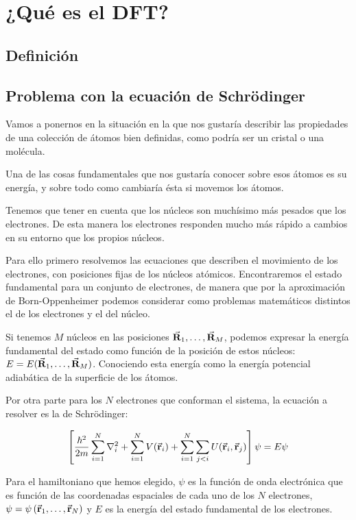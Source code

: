 \section{¿Qué es el DFT?}

\subsection{Definición}

\subsection{Problema con la ecuación de Schrödinger} 

Vamos a ponernos en la situación en la que nos gustaría describir las propiedades de una colección de átomos bien definidas, como podría ser un cristal o una molécula.

Una de las cosas fundamentales que nos gustaría conocer sobre esos átomos es su energía, y sobre todo como cambiaría ésta si movemos los átomos.

Tenemos que tener en cuenta que los núcleos son muchísimo más pesados que los electrones. De esta manera los electrones responden mucho más rápido a cambios en su entorno que los propios núcleos.

Para ello primero resolvemos las ecuaciones que describen el movimiento de los electrones, con posiciones fijas de los núcleos atómicos. Encontraremos el estado fundamental para un conjunto de electrones, de manera que por la aproximación de Born-Oppenheimer podemos considerar como problemas matemáticos distintos el de los electrones y el del núcleo.

Si tenemos $M$ núcleos en las posiciones $\va{R}_1 , \dots , \va{R}_M$, podemos expresar la energía fundamental del estado como función de la posición de estos núcleos: $E = E(\va{R}_1 , \dots , \va{R}_M)$. Conociendo esta energía como la energía potencial adiabática de la superficie de los átomos.

Por otra parte para los $N$ electrones que conforman el sistema, la ecuación a resolver es la de Schrödinger: 

\begin{equation}
    \left[ \frac{\hbar^2}{2m} \sum_{i=1}^{N} \laplacian_i + \sum_{i=1}^{N} V(\va{r}_i) + \sum_{i=1}^{N} \sum_{j<i} U(\va{r}_i , \va{r}_j) \right] \psi = E \psi
\end{equation}


Para el hamiltoniano que hemos elegido, $\psi$ es la función de onda electrónica que es función de las coordenadas espaciales de cada uno de los $N$ electrones, $\psi = \psi \left( \va{r}_{1} , \dots , \va{r}_{N} \right)$  y $E$ es la energía del estado fundamental de los electrones.

